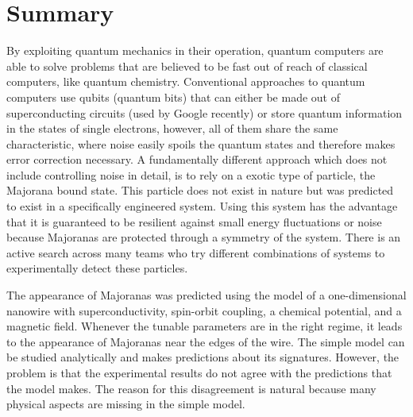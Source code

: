 \chapter*{Summary}

By exploiting quantum mechanics in their operation, quantum computers are able to solve problems that are believed to be fast out of reach of classical computers, like quantum chemistry.
Conventional approaches to quantum computers use qubits (quantum bits) that can either be made out of superconducting circuits (used by Google recently) or store quantum information in the states of single electrons, however, all of them share the same characteristic, where noise easily spoils the quantum states and therefore makes error correction necessary.
A fundamentally different approach which does not include controlling noise in detail, is to rely on a exotic type of particle, the Majorana bound state.
This particle does not exist in nature but was predicted to exist in a specifically engineered system.
Using this system has the advantage that it is guaranteed to be resilient against small energy fluctuations or noise because Majoranas are protected through a symmetry of the system.
There is an active search across many teams who try different combinations of systems to experimentally detect these particles.

The appearance of Majoranas was predicted using the model of a one-dimensional nanowire with superconductivity, spin-orbit coupling, a chemical potential, and a magnetic field.
Whenever the tunable parameters are in the right regime, it leads to the appearance of Majoranas near the edges of the wire.
The simple model can be studied analytically and makes predictions about its signatures.
However, the problem is that the experimental results do not agree with the predictions that the model makes.
The reason for this disagreement is natural because many physical aspects are missing in the simple model.

